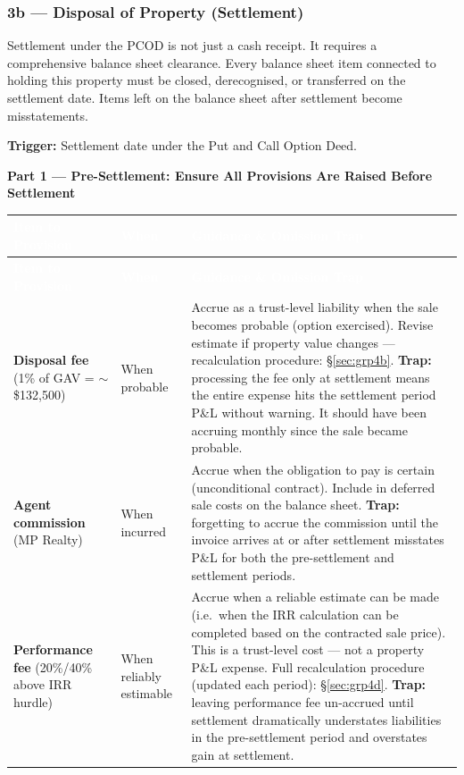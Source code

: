 \documentclass[10pt,a4paper]{article}
\begin{document}
\subsubsection{3b --- Disposal of Property (Settlement)}
\label{sec:grp3b}

Settlement under the PCOD is not just a cash receipt. It requires a comprehensive balance sheet clearance. Every balance sheet item connected to holding this property must be closed, derecognised, or transferred on the settlement date. Items left on the balance sheet after settlement become misstatements.

\textbf{Trigger:} Settlement date under the Put and Call Option Deed.

\textbf{Part 1 --- Pre-Settlement: Ensure All Provisions Are Raised Before Settlement}

{\small\sffamily
\begin{longtable}{@{} L{3.2cm} L{1.8cm} L{7.7cm} @{}}
\textcolor{white}{\bfseries Item to Provision} & \textcolor{white}{\bfseries When} & \textcolor{white}{\bfseries Guidance \& Omission Trap} \\
\midrule
\endfirsthead
{}\textcolor{white}{\bfseries Item to Provision} & \textcolor{white}{\bfseries When} & \textcolor{white}{\bfseries Guidance \& Omission Trap} \\
\midrule
\endhead
\textbf{Disposal fee} (1\% of GAV = $\sim$\$132,500) & When probable & Accrue as a trust-level liability when the sale becomes probable (option exercised). Revise estimate if property value changes --- recalculation procedure: \S\ref{sec:grp4b}. \textbf{Trap:} processing the fee only at settlement means the entire expense hits the settlement period P\&L without warning. It should have been accruing monthly since the sale became probable. \\
\textbf{Agent commission} (MP Realty) & When incurred & Accrue when the obligation to pay is certain (unconditional contract). Include in deferred sale costs on the balance sheet. \textbf{Trap:} forgetting to accrue the commission until the invoice arrives at or after settlement misstates P\&L for both the pre-settlement and settlement periods. \\
\textbf{Performance fee} (20\%/40\% above IRR hurdle) & When reliably estimable & Accrue when a reliable estimate can be made (i.e.\ when the IRR calculation can be completed based on the contracted sale price). This is a trust-level cost --- not a property P\&L expense. Full recalculation procedure (updated each period): \S\ref{sec:grp4d}. \textbf{Trap:} leaving performance fee un-accrued until settlement dramatically understates liabilities in the pre-settlement period and overstates gain at settlement. \\

\end{longtable}}
\end{document}
